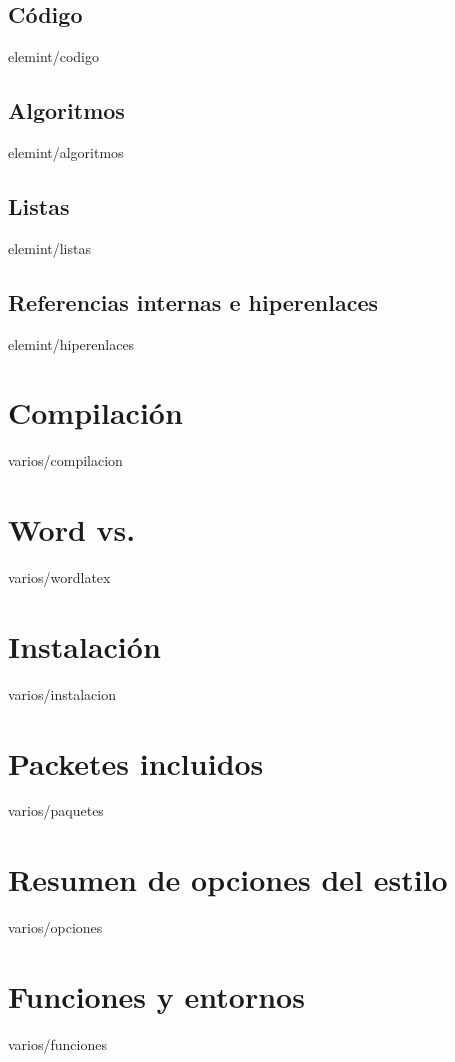 \documentclass[epsbased,copyright,final,printable,covers,extendedindex,firstnumbered,tfg,gnuplot]{tfgtfmthesisuam}
\begin{document}
  \section{Código\label{SEC:CODIGO}}{elemint/codigo}
  \section{Algoritmos\label{SEC:ALGORITMOS}}{elemint/algoritmos}
  \section{Listas\label{SEC:LISTAS}}{elemint/listas}
  \section{Referencias internas e hiperenlaces\label{SEC:HIPERENLACES}}{elemint/hiperenlaces}
\chapter{Compilación\label{CAP:COMPILACION}}{varios/compilacion}

\appendix

\chapter{Word\textsuperscript{\textregistered} vs. \LaTeXe\label{CAP:WORDLATEX}}{varios/wordlatex}
\chapter{Instalación\label{CAP:INSTALACION}}{varios/instalacion}
\chapter{Packetes incluidos\label{CAP:PAQUETES}}{varios/paquetes}
\chapter{Resumen de opciones del estilo\label{CAP:OPCIONES}}{varios/opciones}
\chapter{Funciones y entornos\label{CAP:FUNCENT}}{varios/funciones}
\end{document}
